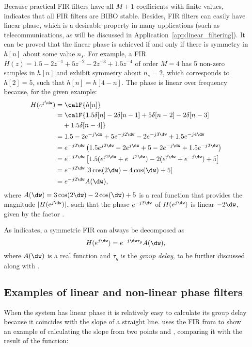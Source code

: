 Because practical FIR filters have all $M+1$ coefficients with finite values,  indicates that all FIR filters are BIBO stable. Besides, FIR filters can easily have linear phase, which is a desirable property in many applications (such as telecommunications, as will be discussed in Application~\ref{app:linear_filtering}). It can be proved that the linear phase is achieved if and only if there is symmetry in $h[n]$ about some value $n_s$. For example, a FIR $H(z)=1.5 -2 z^{-1} + 5 z^{-2} - 2 z^{-3} + 1.5 z^{-4}$ of order $M=4$ has 5 non-zero samples in $h[n]$ and exhibit symmetry about $n_s=2$, which corresponds to $h[2]=5$, such that $h[n]=h[4-n]$. 
The phase is linear over frequency because, for the given example:
\begin{align}
H(e^{j\dw}) & = \calF\{h[n]\} \\
 & = \calF\{1.5\delta[n] - 2 \delta[n-1] + 5 \delta[n-2] - 2 \delta[n-3]\nonumber\\
 & \phantom{\mathrel{=}{}} + 1.5 \delta[n-4]\} \\
 & =  1.5 - 2 e^{-j\dw} + 5 e^{-j2\dw} - 2 e^{-j3\dw} + 1.5 e^{-j4\dw} \\
 & =  e^{-j2\dw} \left( 1.5e^{j2\dw} - 2 e^{j\dw} + 5 - 2 e^{-j\dw} + 1.5 e^{-j2\dw} \right) \\
 & =  e^{-j2\dw} \left[ 1.5 (e^{j2\dw}+e^{-j2\dw}) -2 (e^{j\dw}+e^{-j\dw}) + 5 \right]\\
 & =  e^{-j2\dw} \left[ 3 \cos(2\dw) -4 \cos(\dw) + 5 \right]\\
 & =  e^{-j2\dw} A(\dw),
\label{eq:linear_phase_example}
\end{align}
where $A(\dw)=3 \cos(2\dw) -2 \cos(\dw) + 5$ is a real function that provides the magnitude $|H(e^{j\dw})|$, such that the phase $e^{-j2\dw}$ of $H(e^{j\dw})$ is linear $-2 \dw$, given by the factor . %

As  indicates, a symmetric FIR can always be decomposed as
\[
H(e^{j\dw}) = e^{-j \dw \tau_g} A(\dw),
\]
where $A(\dw)$ is a real function and $\tau_g$ is the \emph{group delay}, to be further discussed along with .

\subsection{Examples of linear and non-linear phase filters}

When the system has linear phase it is relatively easy to calculate its group delay because it coincides with the slope of a straight line.  uses the FIR from  to show an example of calculating the slope from two points  and , comparing it with the result of the  function:

